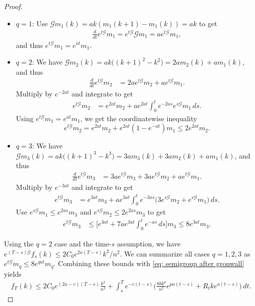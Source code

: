 \documentclass[11pt,reqno]{amsart}
\numberwithin{equation}{section}
\theoremstyle{definition}
\begin{document}
\begin{proof}
\begin{itemize}
\item $q=1$: Use $\mathcal G m_1(k) = ak(m_1(k+1)-m_1(k))=ak$ to get
\begin{align*}
\frac{d}{dt}e^{t\mathcal G}m_1=e^{t\mathcal G}\mathcal Gm_1 = ae^{t\mathcal G}m_1,
\end{align*}
and thus $e^{t\mathcal G}m_1=e^{at}m_1$.
\item $q=2$: We have $\mathcal G m_2(k) = ak\big((k+1)^2-k^2\big) = 2a m_2(k) + am_1(k)$, and thus
\begin{align*}
\frac{d}{dt}e^{t\mathcal G}m_2 &= 2ae^{t\mathcal G}m_2 + a e^{t\mathcal G}m_1.
\end{align*}
Multiply by $e^{-2at}$ and integrate to get
\begin{align*}
e^{t\mathcal G}m_2 &= e^{ 2at}m_2 + ae^{2at}\int_0^t e^{-2as} e^{s\mathcal G}m_1 \,ds.
\end{align*}
Using $e^{t\mathcal G}m_1=e^{at}m_1$, we get the coordinatewise inequality
\[
e^{t\mathcal G}m_2 = e^{ 2at}m_2 + e^{2at}(1-e^{-at}) m_1 \le 2 e^{2at}m_2.
\]
\item $q=3$: We have $\mathcal G m_3(k) = ak\big((k+1)^3-k^3\big) = 3a m_3(k) + 3am_2(k) + am_1(k)$, and thus
\begin{align*}
\frac{d}{dt}e^{t\mathcal G}m_3 &= 3ae^{t\mathcal G}m_3 + 3a e^{t\mathcal G}m_2 + a e^{t\mathcal G}m_1.
\end{align*}
Multiply by $e^{-3at}$ and integrate to get
\begin{align*}
e^{t\mathcal G}m_3 &= e^{ 3at}m_3 + ae^{3at}\int_0^t e^{-3as} \big(3  e^{s\mathcal G}m_2 +   e^{s\mathcal G}m_1\big) \,ds.
\end{align*}
Use $e^{s\mathcal G}m_1\le e^{2as} m_3$ and $e^{s\mathcal G}m_2 \le 2 e^{2as}m_3$ to get
\begin{align*}
e^{t\mathcal G}m_3 &\le \bigg[e^{ 3at} + 7ae^{3at}\int_0^t e^{-as} \,ds\bigg] m_3 \le 8 e^{3at} m_3.
\end{align*}
\end{itemize}
Using the $q=2$ case and the time-$s$ assumption, we have $e^{(T-s)\mathcal G} f_s(k) \le 2C_0 e^{2a(T-s)}k^2/n^2$.
We can summarize all cases $q=1,2,3$ as $e^{t\mathcal G}m_q \le 8e^{qat}m_q$.
Combining these bounds with \eqref{eq: semigroup after gronwall} yields
\begin{align*}
f_{T}(k) \le 2C_0 e^{(2a-c)(T-s)} \frac{k^2}{n^2}  + \int_s^Te^{-c(t-s)}\Big(\frac{8bk^p}{n^2}e^{pa(t-s)}   + R_tke^{a(t-s)}\Big)\,dt.
\end{align*}
\end{proof}
\end{document}
